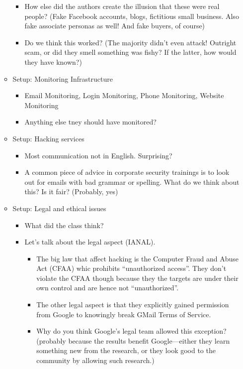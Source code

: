 \documentclass[11pt]{article}
\begin{document}
\begin{itemize}
\begin{itemize}
\begin{itemize}
            \item How else did the authors create the illusion that these were real people? (Fake Facebook accounts, blogs, fictitious small business. Also fake associate personas as well! And fake buyers, of course)
            \item Do we think this worked? (The majority didn't even attack! Outright scam, or did they smell something was fishy? If the latter, how would they have known?)
        \end{itemize}
        \item Setup: Monitoring Infrastructure
        \begin{itemize}
            \item Email Monitoring, Login Monitoring, Phone Monitoring, Website Monitoring
            \item Anything else tney should have monitored?
        \end{itemize}
        \item Setup: Hacking services
        \begin{itemize}
            \item Most communication not in English. Surprising?
            \item A common piece of advice in corporate security trainings is to look out for emails with bad grammar or spelling. What do we think about this? Is it fair? (Probably, yes)
        \end{itemize}
        \item Setup: Legal and ethical issues
        \begin{itemize}
            \item What did the class think?
            \item Let's talk about the legal aspect (IANAL). 
            \begin{itemize}
                \item The big law that affect hacking is the Computer Fraud and Abuse Act (CFAA) whic prohibits ``unauthorized access''. They don't violate the CFAA though because they the targets are under their own control and are hence not ``unauthorized''.
                \item The other legal aspect is that they explicitly gained permission from Google to knowingly break GMail Terms of Service. 
                \item Why do you think Google's legal team allowed this exception? (probably because the results benefit Google---either they learn something new from the research, or they look good to the community by allowing such research.)

\end{itemize}
\end{itemize}
\end{itemize}
\end{itemize}
\end{document}

